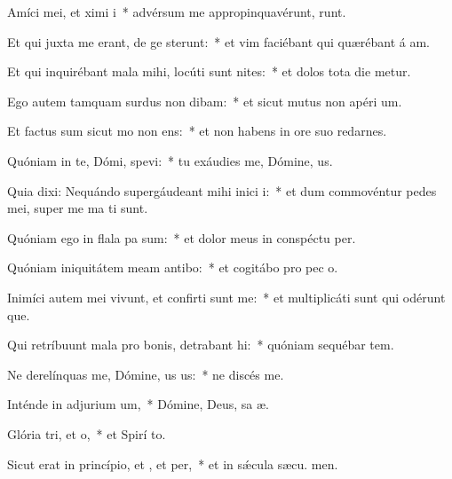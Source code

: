 \item Amíci mei, et ximi i~* advérsum me appropinquavérunt,  runt.
\item Et qui juxta me erant, de ge sterunt:~* et vim faciébant qui quærébant á am.
\item Et qui inquirébant mala mihi, locúti sunt nites:~* et dolos tota die metur.
\item Ego autem tamquam surdus non dibam:~* et sicut mutus non apéri  um.
\item Et factus sum sicut mo non ens:~* et non habens in ore suo redarnes.
\item Quóniam in te, Dómi, spevi:~* tu exáudies me, Dómine,  us.
\item Quia dixi: Nequándo supergáudeant mihi inici i:~* et dum commovéntur pedes mei, super me ma ti sunt.
\item Quóniam ego in flala pa sum:~* et dolor meus in conspéctu  per.
\item Quóniam iniquitátem meam antibo:~* et cogitábo pro pec o.
\item Inimíci autem mei vivunt, et confirti sunt  me:~* et multiplicáti sunt qui odérunt  que.
\item Qui retríbuunt mala pro bonis, detrabant hi:~* quóniam sequébar tem.
\item Ne derelínquas me, Dómine, us us:~* ne discés  me.
\item Inténde in adjurium um,~* Dómine, Deus, sa æ.
\item Glória tri, et o,~* et Spirí to.
\item Sicut erat in princípio, et , et per,~* et in sǽcula sæcu. men.

